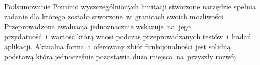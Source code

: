 \begin{chapter}{Podsumowanie}
	Pomimo wyszczególnionych limitacji stworzone narzędzie spełnia zadanie dla którego zostało stworzone~w~granicach swoich możliwości. Przeprowadzona ewaluacja jednoznacznie wskazuje~na~jego przydatność~i~wartość którą wnosi  podczas przeprowadzanych testów~i~badań aplikacji. Aktualna forma~i~oferowany zbiór funkcjonalności jest solidną podstawą która jednocześnie pozostawia dużo miejsca~na~przyszły rozwój.
	
\end{chapter}

